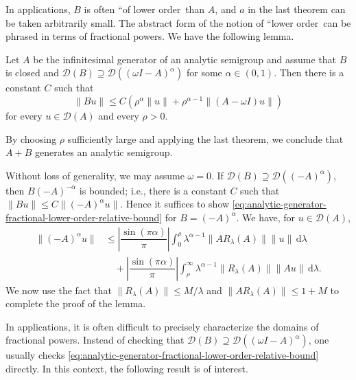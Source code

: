 In applications, $B$ is often ``of lower order\textquotesingle\textquotesingle\ than $A$, and $a$ in the last theorem can be taken arbitrarily small. The abstract form of the notion of ``lower order\textquotesingle\textquotesingle\ can be phrased in terms of fractional powers. We have the following lemma.

\begin{Lemma}
\label{lem:analytic-fractional-lower-order-relative-bound}
Let $A$ be the infinitesimal generator of an analytic semigroup and assume that $B$ is closed and $\mathcal{D}(B)\supseteq\mathcal{D}((\omega I-A)^\alpha)$ for some $\alpha\in(0,1)$. Then there is a constant $C$ such that
\begin{equation}\label{eq:analytic-generator-fractional-lower-order-relative-bound}
\|Bu\|\leq C(\rho^\alpha\|u\|+\rho^{\alpha-1}\|(A-\omega I)u\|)
\end{equation}
for every $u\in\mathcal{D}(A)$ and every $\rho>0$.
\end{Lemma}

By choosing $\rho$ sufficiently large and applying the last theorem, we conclude that $A+B$ generates an analytic semigroup.

\begin{Proof}
Without loss of generality, we may assume $\omega=0$. If $\mathcal{D}(B)\supseteq\mathcal{D}((-A)^\alpha)$, then $B(-A)^{-\alpha}$ is bounded; i.e., there is a constant $C$ such that $\|Bu\|\leq C\|(-A)^\alpha u\|$. Hence it suffices to show \eqref{eq:analytic-generator-fractional-lower-order-relative-bound} for $B=(-A)^\alpha$. We have, for $u\in\mathcal{D}(A)$,\[\begin{aligned}
\|(-A)^\alpha u\|&\leq\left|\dfrac{\sin(\pi\alpha)}{\pi}\right|\int_0^\rho\lambda^{\alpha-1}\|AR_\lambda(A)\|\|u\|\,\mathrm{d}\lambda\\
&\quad+\left|\dfrac{\sin(\pi\alpha)}{\pi}\right|\int_\rho^\infty\lambda^{\alpha-1}\|R_\lambda(A)\|\|Au\|\,\mathrm{d}\lambda.
\end{aligned}\]We now use the fact that $\|R_\lambda(A)\|\leq M/\lambda$ and $\|AR_\lambda(A)\|\leq1+M$ to complete the proof of the lemma.
\end{Proof}

In applications, it is often difficult to precisely characterize the domains of fractional powers. Instead of checking that $\mathcal{D}(B)\supseteq\mathcal{D}((\omega I-A)^\alpha)$, one usually checks \eqref{eq:analytic-generator-fractional-lower-order-relative-bound} directly. In this context, the following result is of interest.

